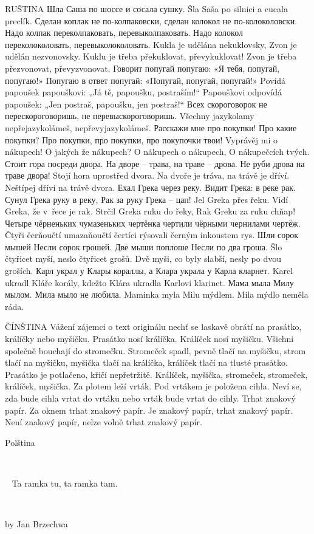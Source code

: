 RUŠTINA
Шла Саша по шоссе и сосала сушку.
Šla Saša po silnici a cucala preclík. 
Сделан коплак не по-колпаковски,
сделан колокол не по-колоколовски.
Надо колпак переколпаковать, перевыколпаковать.
Надо колокол переколоколовать, перевыколоколовать.
Kukla je udělána nekuklovsky,
Zvon je udělán nezvonovsky.
Kuklu je třeba překuklovat, převykuklovat!
Zvon je třeba přezvonovat, převyzvonovat.
Говорит попугай попугаю: «Я тебя, попугай, попугаю!»
Попугаю в ответ попугай: «Попугай, попугай, попугай!»
Povídá papoušek papouškovi: „Já tě, papoušku, postraším!“
Papouškovi odpovídá papoušek: „Jen postraš, papoušku, jen postraš!“
Всех скороговорок не перескороговоришь,
не перевыскороговоришь.
Všechny jazykolamy nepřejazykolámeš,
nepřevyjazykolámeš.
Расскажи мне про покупки!
Про какие покупки?
Про покупки, про покупки,
про покупочки твои!
Vyprávěj mi o nákupech!
O jakých že nákupech?
O nákupech o nákupech,
O nákupečcích tvých.
Стоит гора посреди двора.
На дворе – трава, на траве – дрова.
Не руби дрова на траве двора!
Stojí hora uprostřed dvora.
Na dvoře je tráva, na trávě je dříví.
Neštípej dříví na trávě dvora.
Ехал Грека через реку.
Видит Грека: в реке рак.
Сунул Грека руку в реку,
Рак за руку Грека – цап!
Jel Greka přes řeku.
Vidí Greka, že v řece je rak.
Strčil Greka ruku do řeky,
Rak Greku za ruku chňap!
Четыре чёрненьких чумазеньких чертёнка
чертили чёрными чернилами чертёж.
Čtyři čerňoučtí umazaňoučtí čertíci
rýsovali černým inkoustem rys.
Шли сорок мышей
Несли сорок грошей.
Две мыши поплоше
Несли по два гроша.
Šlo čtyřicet myší,
neslo čtyřicet grošů.
Dvě myši, co byly slabší,
nesly po dvou groších.
Карл украл у Клары кораллы,
а Клара украла у Карла кларнет.
Karel ukradl Kláře korály,
kdežto Klára ukradla Karlovi klarinet.
Мама мыла Милу мылом. Мила мыло не любила.
Maminka myla Milu mýdlem. Mila mýdlo neměla ráda.


ČÍNŠTINA
Vážení zájemci o text originálu nechť se laskavě obrátí na prasátko, králíčky nebo myšičku.
Prasátko nosí králíčka. Králíček nosí myšičku. Všichni společně bouchají do stromečku. Stromeček spadl, pevně tlačí na myšičku, strom tlačí na myšičku, myšička tlačí na králíčka, králíček tlačí na tlusté prasátko. Prasátko je potlačeno, křičí nepřetržitě. Králíček, myšička, stromeček, stromeček, králíček, myšička.
Za plotem leží vrták. Pod vrtákem je položena cihla. Neví se, zda bude cihla vrtat do vrtáku nebo vrták bude vrtat do cihly.
Trhat znakový papír. Za oknem trhat znakový papír. Je znakový papír, trhat znakový papír. Není znakový papír, nelze volně trhat znakový papír.

Polština


 

 
Ta ramka tu, ta ramka tam. 
 

 


by Jan Brzechwa
